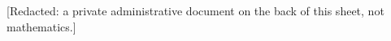 \margin{-}
\margin{-}
[Redacted: a private administrative document on the back of this sheet, not mathematics.]
